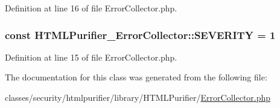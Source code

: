 Definition at line 16 of file Error\+Collector.\+php.

\hypertarget{classHTMLPurifier__ErrorCollector_a50e98b6911ff2b8e78b0c512aec72383}{
\subsubsection[{S\+E\+V\+E\+R\+I\+T\+Y}]{\setlength{\rightskip}{0pt plus 5cm}const H\+T\+M\+L\+Purifier\+\_\+\+Error\+Collector\+::\+S\+E\+V\+E\+R\+I\+T\+Y = 1}}\label{classHTMLPurifier__ErrorCollector_a50e98b6911ff2b8e78b0c512aec72383}


Definition at line 15 of file Error\+Collector.\+php.



The documentation for this class was generated from the following file\+:\begin{DoxyCompactItemize}
\item 
classes/security/htmlpurifier/library/\+H\+T\+M\+L\+Purifier/\hyperlink{ErrorCollector_8php}{Error\+Collector.\+php}\end{DoxyCompactItemize}
